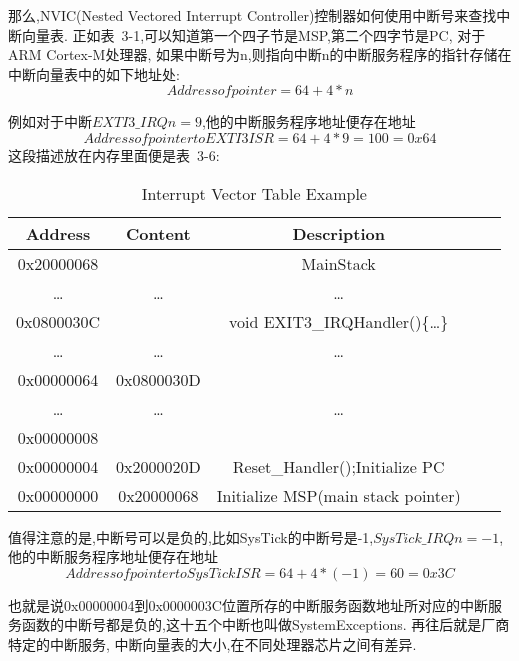那么,NVIC(Nested Vectored Interrupt Controller)控制器如何使用中断号来查找中断向量表.
正如表~3-1,可以知道第一个四子节是MSP,第二个四字节是PC,
对于ARM Cortex-M处理器,
如果中断号为n,则指向中断n的中断服务程序的指针存储在中断向量表中的如下地址处:
$$Address of pointer  = 64 + 4 * n$$

例如对于中断$EXTI3\_IRQn = 9$,他的中断服务程序地址便存在地址
$$Address of pointer to EXTI3 ISR  = 64 + 4 * 9 = 100 = 0x64$$
这段描述放在内存里面便是表~3-6:
\begin{table}[htbp]
    \caption{  Interrupt Vector Table Example }\label{tab:table1}
    \vspace{0.5em}\centering\wuhao
    \begin{tabular}{ccccc}
    \toprule[1.5pt]
    Address & Content & Description \\
    \midrule[1pt]
    0x20000068  &                & MainStack   \\
    \dots        & \dots         & \dots            \\
    0x0800030C  &                 & void EXIT3\_IRQHandler()\{\dots\}   \\
    \dots        & \dots         & \dots            \\
    0x00000064  & 0x0800030D  &                    \\
    \dots        & \dots         & \dots            \\
    0x00000008  &                &                    \\
    0x00000004  & 0x2000020D  & Reset\_Handler();Initialize PC  \\
    0x00000000  & 0x20000068  & Initialize MSP(main stack pointer)   \\  
    \bottomrule[1.5pt]
    \end{tabular}
    \vspace{\baselineskip}
    \end{table}

值得注意的是,中断号可以是负的,比如SysTick的中断号是-1,$SysTick\_IRQn = -1$,他的中断服务程序地址便存在地址
$$Address of pointer to SysTick ISR  = 64 + 4 * (-1) = 60 = 0x3C$$

也就是说0x00000004到0x0000003C位置所存的中断服务函数地址所对应的中断服务函数的中断号都是负的,这十五个中断也叫做SystemExceptions.
再往后就是厂商特定的中断服务,
中断向量表的大小,在不同处理器芯片之间有差异.

